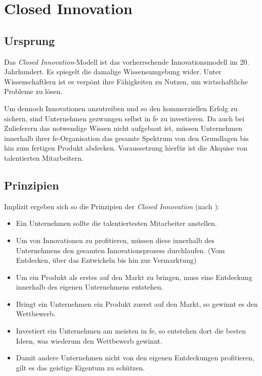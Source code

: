 \section{Closed Innovation}\label{sec:grundlagen-closed}

\subsection{Ursprung}
Das \textit{Closed Innovation}-Modell ist das vorherrschende Innovationsmodell im 20. Jahrhundert.
Es spiegelt die damalige Wissensumgebung wider.
Unter Wissenschaftlern ist es verpönt ihre Fähigkeiten zu Nutzen, um wirtschaftliche Probleme zu lösen.

Um dennoch Innovationen anzutreiben und so den kommerziellen Erfolg zu sichern,
sind Unternehmen gezwungen selbst in \ac{fe} zu investieren.
Da auch bei Zulieferern das notwendige Wissen nicht aufgebaut ist,
müssen Unternehmen innerhalb ihrer \ac{fe}-Organisation das gesamte Spektrum von den Grundlagen bis hin zum fertigen Produkt abdecken.
Voraussetzung hierfür ist die Akquise von talentierten Mitarbeitern.

\subsection{Prinzipien}
Implizit ergeben sich so die Prinzipien der \textit{Closed Innovation} (nach \cite[19]{herzog2011}):
\begin{itemize}
    \item Ein Unternehmen sollte die talentiertesten Mitarbeiter anstellen.
    \item Um von Innovationen zu profitieren, müssen diese innerhalb des Unternehmens den gesamten Innovationsprozess durchlaufen. (Vom Entdecken, über das Entwickeln bis hin zur Vermarktung)
    \item Um ein Produkt als erstes auf den Markt zu bringen, muss eine Entdeckung innerhalb des eigenen Unternehmens entstehen.
    \item Bringt ein Unternehmen ein Produkt zuerst auf den Markt, so gewinnt es den Wettbewerb.
    \item Investiert ein Unternehmen am meisten in \ac{fe}, so entstehen dort die besten Ideen, was wiederum den Wettbewerb gewinnt.
    \item Damit andere Unternehmen nicht von den eigenen Entdeckungen profitieren, gilt es das geistige Eigentum zu schützen.
\end{itemize}

